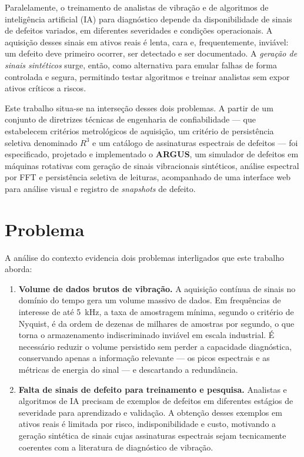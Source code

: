 Paralelamente, o treinamento de analistas de vibração e de algoritmos de
inteligência artificial (IA) para diagnóstico depende da disponibilidade de
sinais de defeitos variados, em diferentes severidades e condições
operacionais. A aquisição desses sinais em ativos reais é lenta, cara e,
frequentemente, inviável: um defeito deve primeiro ocorrer, ser detectado e ser
documentado. A \emph{geração de sinais sintéticos} surge, então, como
alternativa para emular falhas de forma controlada e segura, permitindo testar
algoritmos e treinar analistas sem expor ativos críticos a riscos.

Este trabalho situa-se na interseção desses dois problemas. A partir de um
conjunto de diretrizes técnicas de engenharia de confiabilidade --- que
estabelecem critérios metrológicos de aquisição, um critério de persistência
seletiva denominado \(R^3\) e um catálogo de assinaturas espectrais de defeitos
--- foi especificado, projetado e implementado o \textbf{ARGUS}, um simulador de
defeitos em máquinas rotativas com geração de sinais vibracionais sintéticos,
análise espectral por FFT e persistência seletiva de leituras, acompanhado de
uma interface web para análise visual e registro de \emph{snapshots} de
defeito.

\section{Problema}

A análise do contexto evidencia dois problemas interligados que este trabalho
aborda:

\begin{enumerate}
  \item \textbf{Volume de dados brutos de vibração.} A aquisição contínua de
  sinais no domínio do tempo gera um volume massivo de dados. Em frequências
  de interesse de até 5~kHz, a taxa de amostragem mínima, segundo o critério de
  Nyquist, é da ordem de dezenas de milhares de amostras por segundo, o que
  torna o armazenamento indiscriminado inviável em escala industrial. É
  necessário reduzir o volume persistido sem perder a capacidade diagnóstica,
  conservando apenas a informação relevante --- os picos espectrais e as
  métricas de energia do sinal --- e descartando a redundância.
  \item \textbf{Falta de sinais de defeito para treinamento e pesquisa.}
  Analistas e algoritmos de IA precisam de exemplos de defeitos em diferentes
  estágios de severidade para aprendizado e validação. A obtenção desses
  exemplos em ativos reais é limitada por risco, indisponibilidade e custo,
  motivando a geração sintética de sinais cujas assinaturas espectrais sejam
  tecnicamente coerentes com a literatura de diagnóstico de vibração.
\end{enumerate}

